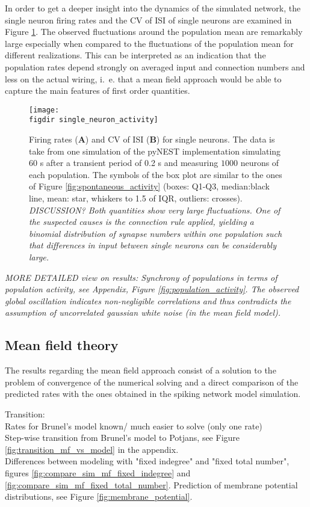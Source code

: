 In order to get a deeper insight into the dynamics of the simulated network, the single neuron firing 
rates and the CV of ISI of single neurons are examined in Figure \ref{fig:single_neuron_activity}.
The observed fluctuations around the population mean are remarkably large especially when compared 
to the fluctuations of the population mean for different realizations. This can be interpreted as 
an indication that the population rates depend strongly on averaged input and connection numbers
and less on the actual wiring, i.~e. that a mean field approach would be able to capture the main features 
of first order quantities. 
\begin{figure}[htpb]
    \centering
    \texttt{[image: \\figdir single\_neuron\_activity]}
    \caption{
        Firing rates (\textbf{A}) and CV of ISI (\textbf{B}) for single neurons. 
        The data is take from one simulation of the pyNEST implementation 
        simulating $60$ s after a transient period of 0.2 s and measuring 
        $1000$ neurons of each population. The symbols of the box plot 
        are similar to the ones of Figure \ref{fig:spontaneous_activity} 
        (boxes: Q1-Q3, median:black line, mean: star, 
        whiskers to 1.5 of IQR, outliers: crosses). 
        \emph{DISCUSSION?
        Both quantities show very large fluctuations. One of the suspected
        causes is the connection rule applied, yielding a binomial distribution 
        of synapse numbers within one population
        such that differences in input between single neurons can be 
    considerably large.}
    }
    \label{fig:single_neuron_activity}
\end{figure}


\emph{MORE DETAILED view on results:
Synchrony of populations in terms of population activity, 
see Appendix, Figure \ref{fig:population_activity}. 
The observed global oscillation indicates non-negligible correlations
and thus contradicts the assumption of uncorrelated gaussian white noise 
(in the mean field model).}

\subsection{Mean field theory}
The results regarding the mean field approach consist of a solution to the problem 
of convergence of the numerical solving and a direct comparison of the predicted rates
with the ones obtained in the spiking network model simulation.

Transition: \\
Rates for Brunel's model known/ much easier to solve (only one rate) \\
Step-wise transition from Brunel's model to Potjans, see Figure \ref{fig:transition_mf_vs_model} 
in the appendix. \\
Differences between modeling with "fixed indegree" and "fixed total number",
figures \ref{fig:compare_sim_mf_fixed_indegree} and 
\ref{fig:compare_sim_mf_fixed_total_number}.
Prediction of membrane potential distributions, see Figure
\ref{fig:membrane_potential}. 


